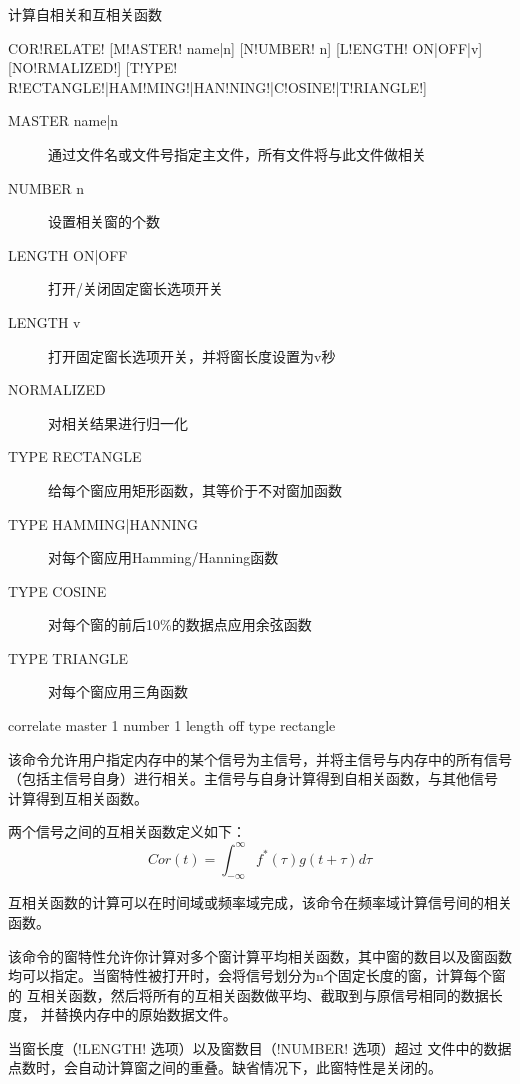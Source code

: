 \label{cmd:correlate}

计算自相关和互相关函数

\begin{SACSTX}
COR!RELATE! [M!ASTER! name|n] [N!UMBER! n] [L!ENGTH! ON|OFF|v] [NO!RMALIZED!]
    [T!YPE! R!ECTANGLE!|HAM!MING!|HAN!NING!|C!OSINE!|T!RIANGLE!]
\end{SACSTX}

\begin{description}
\item [MASTER name|n] 通过文件名或文件号指定主文件，所有文件将与此文件做相关
\item [NUMBER n] 设置相关窗的个数
\item [LENGTH ON|OFF] 打开/关闭固定窗长选项开关
\item [LENGTH v] 打开固定窗长选项开关，并将窗长度设置为v秒
\item [NORMALIZED] 对相关结果进行归一化
\item [TYPE RECTANGLE] 给每个窗应用矩形函数，其等价于不对窗加函数
\item [TYPE HAMMING|HANNING] 对每个窗应用Hamming/Hanning函数
\item [TYPE COSINE] 对每个窗的前后10\%的数据点应用余弦函数
\item [TYPE TRIANGLE] 对每个窗应用三角函数
\end{description}

\begin{SACDFT}
correlate master 1 number 1 length off type rectangle
\end{SACDFT}

该命令允许用户指定内存中的某个信号为主信号，并将主信号与内存中的所有信号
（包括主信号自身）进行相关。主信号与自身计算得到自相关函数，与其他信号
计算得到互相关函数。

两个信号之间的互相关函数定义如下：
\[ Cor(t) = \int_{-\infty} ^\infty f^*(\tau)g(t+\tau)d\tau \]

互相关函数的计算可以在时间域或频率域完成，该命令在频率域计算信号间的相关
函数。

该命令的窗特性允许你计算对多个窗计算平均相关函数，其中窗的数目以及窗函数
均可以指定。当窗特性被打开时，会将信号划分为n个固定长度的窗，计算每个窗的
互相关函数，然后将所有的互相关函数做平均、截取到与原信号相同的数据长度，
并替换内存中的原始数据文件。

当窗长度（!LENGTH! 选项）以及窗数目（!NUMBER! 选项）超过
文件中的数据点数时，会自动计算窗之间的重叠。缺省情况下，此窗特性是关闭的。

